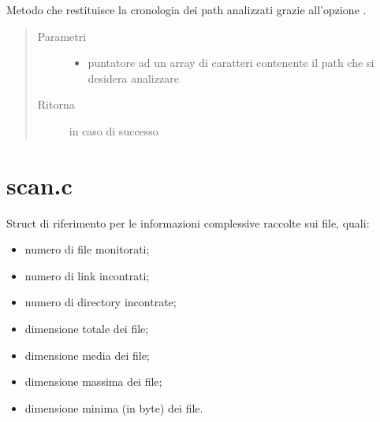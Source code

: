 \documentclass[letterpaper,10pt,italian,openany,oneside]{sphinxmanual}
\begin{document}

\begin{fulllineitems}
\label{\detokenize{code/main:c.getHistoryPath}}
Metodo che restituisce la cronologia dei path analizzati grazie all’opzione .
\begin{quote}\begin{description}
\item[{Parametri}] \leavevmode\begin{itemize}
\item {} 
 \textendash{} puntatore ad un array di caratteri contenente il path che si desidera analizzare

\end{itemize}

\item[{Ritorna}]  in caso di successo

\end{description}\end{quote}

\end{fulllineitems}



\section{scan.c}
\label{\detokenize{code/scan:scan-c}}\label{\detokenize{code/scan::doc}}

\begin{fulllineitems}
\label{\detokenize{code/scan:c.stats}}
Struct di riferimento per le informazioni complessive raccolte sui file, quali:
\begin{itemize}
\item {} 
numero di file monitorati;

\item {} 
numero di link incontrati;

\item {} 
numero di directory incontrate;

\item {} 
dimensione totale dei file;

\item {} 
dimensione media dei file;

\item {} 
dimensione massima dei file;

\item {} 
dimensione minima (in byte) dei file.

\end{itemize}

\end{fulllineitems}
\end{document}
